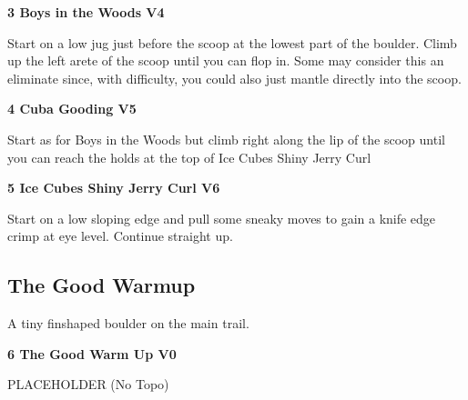 \begin{multicols}{2}

					\begin{minipage}{\linewidth}	
					\label{rt:Boys in the Woods}\colorbox{RoyalBlue!20}{\textbf{3 Boys in the Woods V4 \ding{72}   }}
					\begin{adjustwidth}{0.5cm}{}				
					Start on a low jug just before the scoop at the lowest part of the boulder. Climb up the left arete of the scoop until you can flop in. Some may consider this an eliminate since, with difficulty, you could also just mantle directly into the scoop.
					\end{adjustwidth}
					\end{minipage}
					\begin{minipage}{\linewidth}	
					\label{rt:Cuba Gooding}\colorbox{RoyalBlue!20}{\textbf{4 Cuba Gooding V5  }}
					\begin{adjustwidth}{0.5cm}{}				
					Start as for Boys in the Woods but climb right along the lip of the scoop until you can reach the holds at the top of Ice Cubes Shiny Jerry Curl
					\end{adjustwidth}
					\end{minipage}
					\begin{minipage}{\linewidth}	
					\label{rt:Ice Cubes Shiny Jerry Curl}\colorbox{RoyalBlue!20}{\textbf{5 Ice Cubes Shiny Jerry Curl V6  }}
					\begin{adjustwidth}{0.5cm}{}				
					Start on a low sloping edge and pull some sneaky moves to gain a knife edge crimp at eye level. Continue straight up.
					\end{adjustwidth}
					\end{minipage}
			\subsection*{The Good Warmup}\label{bf:The Good Warmup}
			\begin{minipage}{\columnwidth}
			A tiny finshaped boulder on the main trail.
			\end{minipage}
			
					\begin{minipage}{\linewidth}	
					\label{rt:The Good Warm Up}\colorbox{green!20}{\textbf{6 The Good Warm Up V0  }}
					\begin{adjustwidth}{0.5cm}{}				
					PLACEHOLDER
						\newline (No Topo) 
					\end{adjustwidth}
					\end{minipage}

\end{multicols}
